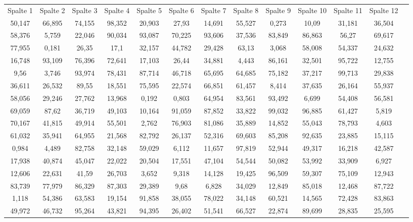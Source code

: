 \documentclass[border=0.5cm]{standalone}
\begin{document}
\begin{tabular}{SSSSSSSSSSSSS} \toprule
{Spalte 1} &{Spalte 2} &{Spalte 3} &{Spalte 4} &{Spalte 5} &{Spalte 6} &{Spalte 7} &{Spalte 8} &{Spalte 9} &{Spalte 10} &{Spalte 11} &{Spalte 12}  \\ \cmidrule(lr){2-12}
50,147	&	66,895	&	74,155	&	98,352	&	20,903	&	27,93	&	14,691	&	55,527	&	0,273	&	10,09	&	31,181	&	36,504	\\
58,376	&	5,759	&	22,046	&	90,034	&	93,087	&	70,225	&	93,606	&	37,536	&	83,849	&	86,863	&	56,27	&	69,617	\\
77,955	&	0,181	&	26,35	&	17,1	&	32,157	&	44,782	&	29,428	&	63,13	&	3,068	&	58,008	&	54,337	&	24,632	\\
16,748	&	93,109	&	76,396	&	72,641	&	17,103	&	26,44	&	34,881	&	4,443	&	86,161	&	32,501	&	95,722	&	12,755	\\
9,56	&	3,746	&	93,974	&	78,431	&	87,714	&	46,718	&	65,695	&	64,685	&	75,182	&	37,217	&	99,713	&	29,838	\\
36,611	&	26,532	&	89,55	&	18,551	&	75,595	&	22,574	&	66,851	&	61,457	&	8,414	&	37,635	&	26,164	&	55,937	\\
58,056	&	29,246	&	27,762	&	13,968	&	0,192	&	0,803	&	64,954	&	83,561	&	93,492	&	6,699	&	54,408	&	56,581	\\
69,059	&	87,62	&	36,719	&	49,103	&	10,164	&	91,059	&	87,852	&	33,822	&	99,032	&	96,885	&	61,427	&	5,819	\\
70,167	&	41,815	&	49,914	&	55,501	&	2,762	&	76,903	&	81,086	&	35,889	&	14,852	&	55,043	&	78,793	&	4,603	\\
61,032	&	35,941	&	64,955	&	21,568	&	82,792	&	26,137	&	52,316	&	69,603	&	85,208	&	92,635	&	23,885	&	15,115	\\
0,984	&	4,489	&	82,758	&	32,148	&	59,029	&	6,112	&	11,657	&	97,819	&	52,944	&	49,317	&	16,218	&	42,587	\\
17,938	&	40,874	&	45,047	&	22,022	&	20,504	&	17,551	&	47,104	&	54,544	&	50,082	&	53,992	&	33,909	&	6,927	\\
12,606	&	22,631	&	41,59	&	26,703	&	3,652	&	9,318	&	14,128	&	19,425	&	96,509	&	59,307	&	75,109	&	12,943	\\
83,739	&	77,979	&	86,329	&	87,303	&	29,389	&	9,68	&	6,828	&	34,029	&	12,849	&	85,018	&	12,468	&	87,722	\\
1,118	&	54,386	&	63,583	&	19,154	&	91,858	&	38,055	&	78,022	&	34,148	&	60,521	&	14,565	&	72,428	&	83,863	\\
49,972	&	46,732	&	95,264	&	43,821	&	94,395	&	26,402	&	51,541	&	66,527	&	22,874	&	89,699	&	28,835	&	25,595	\\

\end{tabular}
\end{document}
